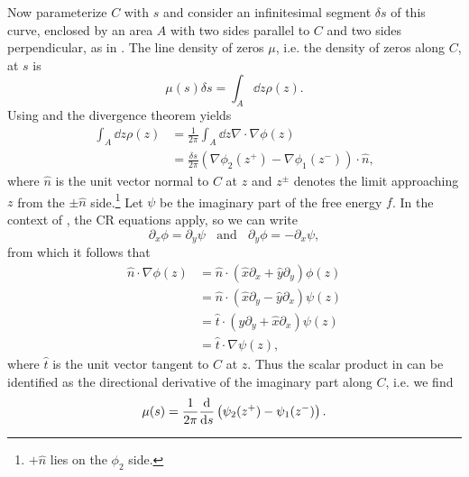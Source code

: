 Now parameterize $C$ with $s$ and consider an infinitesimal segment 
$\delta s$ of this curve, enclosed by an
area $A$ with two sides parallel to $C$ and two sides perpendicular, as
in . The line density of zeros $\mu$, i.e. the density
of zeros along $C$, at $s$ is
\begin{equation}
\mu(s)\delta s=\int_A\dd z\rho(z).
\end{equation}
Using  and the divergence theorem yields
\begin{equation}\begin{aligned}\label{eq:LYarea}
\int_A\dd{z}\rho(z)
&=\frac{1}{2\pi}\int_A\dd{z}\nabla\cdot\nabla\phi(z)\\
&=\frac{\delta s}{2\pi}\left(\nabla\phi_2(z^+)-\nabla\phi_1(z^-)\right)\cdot\hat{n},
\end{aligned}\end{equation}
where $\hat n$ is the unit vector normal to $C$ at $z$ and $z^{\pm}$ denotes
the limit approaching $z$ from the $\pm\hat{n}$ side.\footnote{$+\hat{n}$
lies on the $\phi_2$ side.} 
Let $\psi$ be the imaginary part of the free energy $f$. 
In the context of , the CR equations apply, so we can write
\begin{equation}
\partial_x\phi=\partial_y\psi~~~~\text{and}~~~~\partial_y\phi=-\partial_x\psi,
\end{equation}
from which it follows that
\begin{equation}\begin{aligned}
\hat{n}\cdot\nabla\phi(z)
&=\hat{n}\cdot\left(\hat{x}\partial_x+\hat{y}\partial_y\right)\phi(z)\\
&=\hat{n}\cdot\left(\hat{x}\partial_y-\hat{y}\partial_x\right)\psi(z)\\
&=\hat{t}\cdot\left(\hat{y}\partial_y+\hat{x}\partial_x\right)\psi(z)\\
&=\hat{t}\cdot\nabla\psi(z),
\end{aligned}\end{equation}
where $\hat{t}$ is the unit vector tangent to $C$ at $z$. Thus the scalar
product in  can be identified as the directional derivative
of the imaginary part along $C$, i.e. we find
\begin{equation}\label{eq:lineDensityMu}
\mu(s)=\frac{1}{2\pi}\dv{}{s}\left(\psi_2(z^+)-\psi_1(z^-)\right).
\end{equation}

